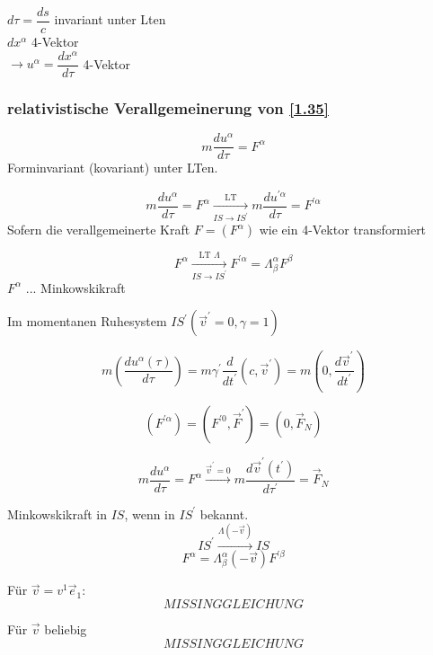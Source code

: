 \documentclass[a4paper, 11pt]{article}
\numberwithin{equation}{section}
\begin{document}
$d\tau = \dfrac{ds}{c}$ invariant unter Lten \\
$dx^\alpha$ 4-Vektor \\
$\rightarrow u^\alpha = \dfrac{dx^\alpha}{d\tau}$ 4-Vektor

\subsubsection*{relativistische Verallgemeinerung von \ref{1.35}}

\begin{equation}
m \dfrac{du^\alpha}{d\tau} = F^\alpha
\end{equation}
Forminvariant (kovariant) unter LTen.

\begin{equation}
m \dfrac{du^\alpha}{d\tau} = F^\alpha \xrightarrow[IS \rightarrow IS^\prime]{\text{LT}} m \dfrac{du^{\prime \alpha}}{d\tau} = F^{\prime \alpha}
\end{equation}
Sofern die verallgemeinerte Kraft $F = (F^\alpha)$ wie ein 4-Vektor transformiert

\begin{equation}
F^\alpha \xrightarrow[IS \rightarrow IS^\prime]{\text{LT } \Lambda} F^{\prime \alpha} = \Lambda^\alpha_\beta F^\beta
\end{equation}
$F^\alpha$ ... Minkowskikraft


Im momentanen Ruhesystem $IS^\prime (\vec{v}^\prime = 0, \gamma = 1)$

\begin{equation}
m \left( \dfrac{du^\alpha(\tau)}{d\tau} \right) = m \gamma^\prime \dfrac{d}{dt^\prime} (c,\vec{v}^\prime) = m \left( 0, \dfrac{d\vec{v}^\prime}{dt^\prime} \right) 
\end{equation}


\begin{equation}
\left(F^{\prime\alpha} \right) = \left(F^{\prime0}, \vec{F}^\prime \right) = \left( 0, \vec{F}_N \right)
\end{equation}

\begin{equation*}
m \dfrac{du^\alpha}{d\tau} = F^\alpha \xrightarrow{\vec{v}^\prime = 0} m \dfrac{d\vec{v}^\prime(t^\prime)}{d\tau^\prime} = \vec{F}_N
\end{equation*}

Minkowskikraft in $IS$, wenn in $IS^\prime$ bekannt.\\
\begin{equation*}
IS^\prime \xrightarrow{\Lambda(-\vec{v})} IS
\end{equation*}
\begin{equation}
F^\alpha = \Lambda^\alpha_\beta(-\vec{v}) F^{\prime \beta}
\end{equation}

Für $\vec{v}= v^1\vec{e}_1$:
\begin{equation}
MISSING GLEICHUNG
\end{equation}

Für $\vec{v}$ beliebig
\begin{equation}
MISSING GLEICHUNG
\end{equation}
\end{document}
